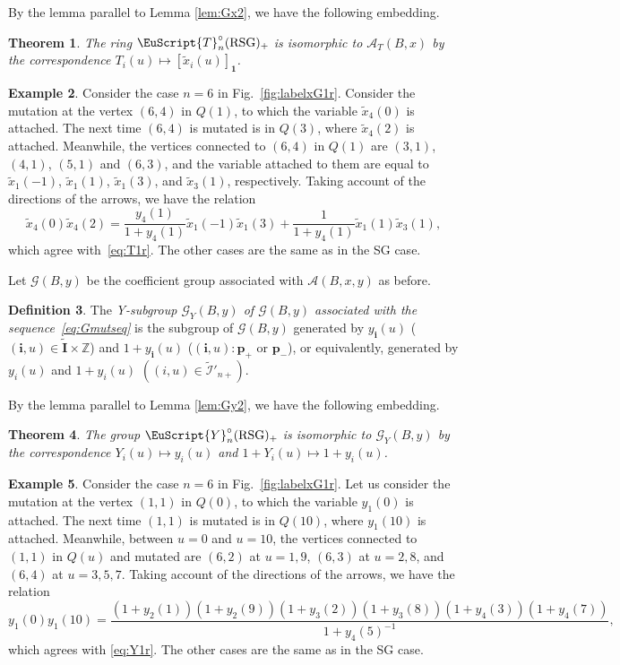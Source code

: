 \documentclass[pdftex]{sigma}
\numberwithin{equation}{section}
\newtheorem{Theorem}{Theorem}[section]
\theoremstyle{definition}
\newtheorem{Definition}[Theorem]{Definition}
\newtheorem{Example}[Theorem]{Example}
\begin{document}
By the lemma parallel
to Lemma \ref{lem:Gx2}, we have the following embedding.
\begin{Theorem}
\label{thm:GTisor}
The ring $\EuScript{T}^{\circ}_{n}(\mathrm{RSG})_+$ is isomorphic to
$\mathcal{A}_T(B,x)$ by the correspondence
$T_i(u)\mapsto [\tilde{x}_i(u)]_{\mathbf{1}}$.
\end{Theorem}


\begin{Example}
Consider the case $n=6$ in Fig.~\ref{fig:labelxG1r}.
Consider the mutation at the vertex $(6,4)$ in $Q(1)$,
to which  the variable $\tilde{x}_4(0)$ is attached.
The next time $(6,4)$ is mutated is in $Q(3)$,
where $\tilde{x}_4(2)$ is attached.
Meanwhile, the vertices connected to $(6,4)$ in $Q(1)$
are $(3,1)$, $(4,1)$, $(5,1)$ and $(6,3)$,
and the  variable attached to them are equal to
$\tilde{x}_1(-1)$, $\tilde{x}_1(1)$, $\tilde{x}_1(3)$, and $\tilde{x}_3(1)$, respectively.
Taking account of the directions of the arrows,
we have the relation
\[
\tilde{x}_4(0)\tilde{x}_4(2)=
\frac{y_4(1)}{1+y_4(1)} \tilde{x}_1(-1)\tilde{x}_1(3)
+ \frac{1}{1+y_4(1)} \tilde{x}_1(1)\tilde{x}_3(1),
\]
which agree with~\eqref{eq:T1r}.
The other cases are the same as in the SG case.
\end{Example}



Let  $\mathcal{G}(B,y)$ be the
coef\/f\/icient group
associated with $\mathcal{A}(B,x,y)$ as before.

\begin{Definition}
The {\em Y-subgroup
$\mathcal{G}_Y(B,y)$
of $\mathcal{G}(B,y)$
associated with the sequence~\eqref{eq:Gmutseq}}
is the subgroup of
$\mathcal{G}(B,y)$
generated by
$y_{\mathbf{i}}(u)$
($(\mathbf{i},u)\in \tilde{\mathbf{I}}\times \mathbb{Z}$)
and $1+y_{\mathbf{i}}(u)$
($(\mathbf{i},u):\mathbf{p}_+$ or $\mathbf{p}_-$),
or equivalently,
generated by $y_i(u)$ and $1+y_i(u)$
$((i,u)\in \tilde{\mathcal{I}}'_{n+})$.
\end{Definition}

By the lemma parallel to Lemma \ref{lem:Gy2},
 we have the following embedding.
\begin{Theorem}
\label{thm:GYisor}
The group $\EuScript{Y}^{\circ}_{n}(\mathrm{RSG})_+$ is isomorphic to
$\mathcal{G}_Y(B,y)$ by the correspondence
$Y_i(u)\mapsto y_i(u)$
and $1+Y_i(u)\mapsto 1+y_i(u)$.
\end{Theorem}

\begin{Example}
Consider the case $n=6$ in Fig.~\ref{fig:labelxG1r}.
Let us consider the mutation at the vertex $(1,1)$ in $Q(0)$,
to which  the variable $y_1(0)$ is attached.
The next time $(1,1)$ is mutated is in $Q(10)$,
where $y_1(10)$ is attached.
Meanwhile, between $u=0$ and $u=10$,
the vertices connected to $(1,1)$ in $Q(u)$ and mutated
are
$(6,2)$ at $u=1,9$, $(6,3)$ at $u=2,8$, and $(6,4)$ at $u=3,5,7$.
Taking account of the directions of the arrows,
we have the relation
\[
y_1(0)y_1(10)=
\frac{
(1+y_2(1))(1+y_2(9))(1+y_3(2))(1+y_3(8)) (1+y_4(3))
 (1+y_4(7))
}
{1+y_4(5)^{-1}},
\]
which agrees with
\eqref{eq:Y1r}.
The other cases are the same as in the SG case.
\end{Example}
\end{document}
